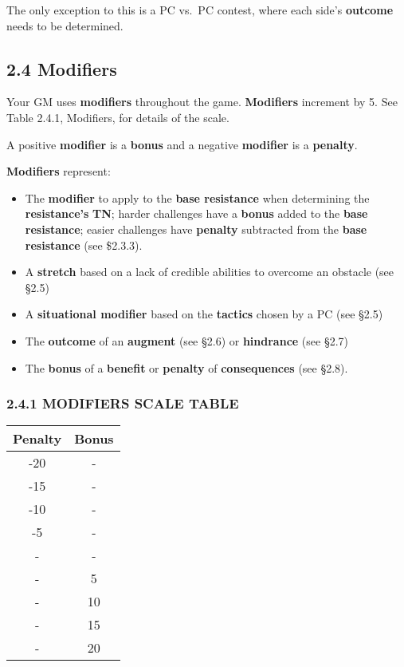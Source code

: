 \documentclass[
  11pt,
]{article}
\providecommand{\tightlist}{%
  \setlength{\itemsep}{0pt}\setlength{\parskip}{0pt}}
\begin{document}
The only exception to this is a PC vs.~PC contest, where each side's
\textbf{outcome} needs to be determined.

\hypertarget{modifiers}{%
\subsection{2.4 Modifiers}\label{modifiers}}

Your GM uses \textbf{modifiers} throughout the game. \textbf{Modifiers}
increment by 5. See Table 2.4.1, Modifiers, for details of the scale.

A positive \textbf{modifier} is a \textbf{bonus} and a negative
\textbf{modifier} is a \textbf{penalty}.

\textbf{Modifiers} represent:

\begin{itemize}
\tightlist
\item
  The \textbf{modifier} to apply to the \textbf{base resistance} when
  determining the \textbf{resistance's} \textbf{TN}; harder challenges
  have a \textbf{bonus} added to the \textbf{base resistance}; easier
  challenges have \textbf{penalty} subtracted from the \textbf{base
  resistance} (see \$2.3.3).
\item
  A \textbf{stretch} based on a lack of credible abilities to overcome
  an obstacle (see §2.5)
\item
  A \textbf{situational modifier} based on the \textbf{tactics} chosen
  by a PC (see §2.5)
\item
  The \textbf{outcome} of an \textbf{augment} (see §2.6) or
  \textbf{hindrance} (see §2.7)
\item
  The \textbf{bonus} of a \textbf{benefit} or \textbf{penalty} of
  \textbf{consequences} (see §2.8).
\end{itemize}

\hypertarget{modifiers-scale-table}{%
\subsubsection{2.4.1 MODIFIERS SCALE
TABLE}\label{modifiers-scale-table}}

\begin{longtable}[]{@{}cc@{}}
\toprule
Penalty & Bonus \\
\midrule
\endhead
-20 & - \\
-15 & - \\
-10 & - \\
-5 & - \\
- & - \\
- & 5 \\
- & 10 \\
- & 15 \\
- & 20 \\
\bottomrule
\end{longtable}
\end{document}

